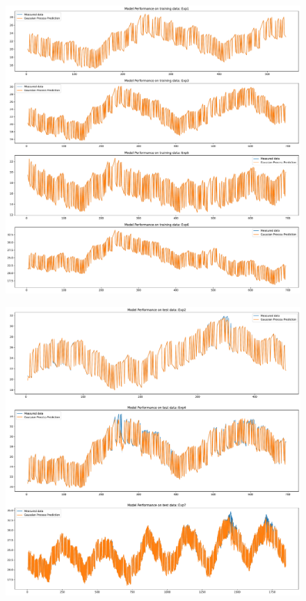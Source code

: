 \begin{figure}[ht]
    \centering
    \includegraphics[width = \textwidth]{Plots/GP_313_training_performance.pdf}
    \caption{}
    \label{fig:GP_313_train_validation}
\end{figure}

\begin{figure}[ht]
    \centering
    \includegraphics[width = \textwidth]{Plots/GP_313_test_performance.pdf}
    \caption{}
    \label{fig:GP_313_test_validation}
\end{figure}


